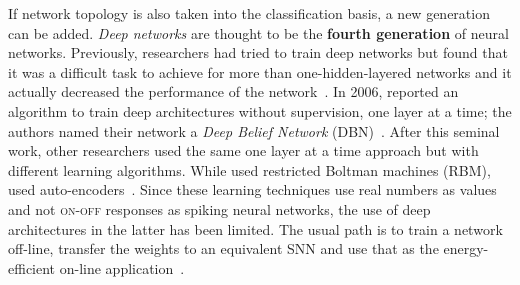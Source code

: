 If network topology is also taken into the classification basis, a new generation can be added. \emph{Deep networks} are thought to be the \textbf{fourth generation} of neural networks. Previously, researchers had tried to train deep networks but found that it was a difficult task to achieve for more than one-hidden-layered networks and it actually decreased the performance of the network~\cite{learning-deep-Bengio2009}. In 2006, \citeauthor{hinton2006fast} reported an algorithm to train deep architectures without supervision, one layer at a time; the authors named their network a \emph{Deep Belief Network} (DBN)~\cite{hinton2006fast}. After this seminal work, other researchers used the same one layer at a time  approach but with different learning algorithms. While \citeauthor{hinton2006fast} used restricted Boltman machines (RBM), \citeauthor{autoencoders-lecun2007} used auto-encoders~\cite{autoencoders-lecun2007}. Since these learning techniques use real numbers as values and not \textsc{on-off} responses as spiking neural networks, the use of deep architectures in the latter has been limited. The usual path is to train a network off-line, transfer the weights to an equivalent SNN and use that as the energy-efficient on-line application~\cite{evangelos-deep-belief,diehlfast-deep-net}.